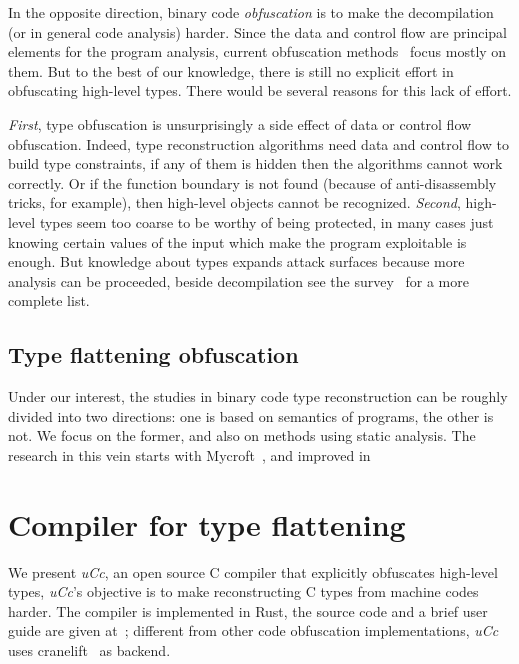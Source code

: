 \documentclass[a4paper]{llncs}
\begin{document}
In the opposite direction, binary code \emph{obfuscation} is to make the decompilation (or in
general code analysis) harder. Since the data and control flow are principal elements for the
program analysis, current obfuscation methods~\cite{collberg_surreptitious_2009} focus mostly
on them. But to the best of our knowledge, there is still no explicit effort in obfuscating
high-level types. There would be several reasons for this lack of effort.

\emph{First}, type obfuscation is unsurprisingly a side effect of data or control flow obfuscation.
Indeed, type reconstruction algorithms need data and control flow to build type constraints,
if any of them is hidden
then the algorithms cannot work correctly. Or if the function boundary is not found
(because of anti-disassembly tricks, for example), then high-level objects cannot be recognized.
\emph{Second}, high-level types seem too coarse to be worthy
of being protected, in many cases just knowing certain values of the input which make the program
exploitable is enough. But knowledge about types expands attack surfaces because more analysis
can be proceeded, beside decompilation see the survey~\cite{caballero_type_2016} for a
more complete list.

\subsection*{Type flattening obfuscation}
Under our interest, the studies in binary code type reconstruction can be roughly divided into
two directions: one is based on semantics of programs, the other is not. We focus on the former,
and also on methods using static analysis. The research in this vein starts with
Mycroft~\cite{mycroft_type-based_1999}, and improved in~\cite{lee_tie_2011,noonan_polymorphic_2016,elwazeer_scalable_2013}

\section{Compiler for type flattening}
We present \emph{uCc}, an open source C compiler that explicitly obfuscates high-level types, \emph{uCc}'s
objective is to make reconstructing C types from machine codes harder.
The compiler is implemented in Rust, the source code and a brief user guide are given at~\cite{ta_ucc_nodate};
different from other code obfuscation implementations, \emph{uCc} uses cranelift~\cite{noauthor_cranelift_nodate}
as backend.
\end{document}
